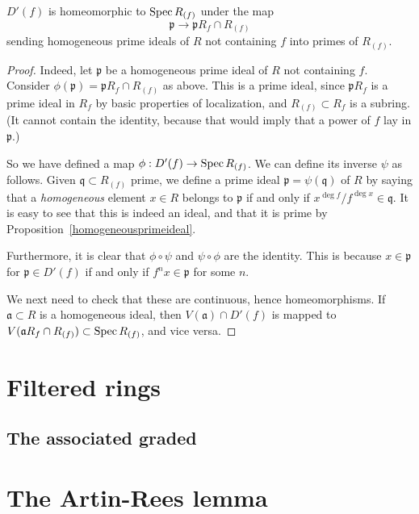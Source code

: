 \begin{proposition} 
$D'(f)$ is homeomorphic to $\operatorname{Spec} R_{(f)}$ under the map
\[  \mathfrak{p}  \to \mathfrak{p} R_f \cap R_{(f)}  \]
sending homogeneous prime ideals of $R$ not containing $f$ into primes of
$R_{(f)}$.
\end{proposition} 
\begin{proof} 
Indeed, let $\mathfrak{p}$ be a homogeneous prime ideal of $R$ not containing
$f$. Consider $\phi(\mathfrak{p}) = \mathfrak{p} R_f \cap R_{(f)} $ as above.
This is a prime ideal, since $\mathfrak{p}  R_f$ is a prime ideal in $R_f$ by
basic properties of localization, and $R_{(f)} \subset R_f$ is a subring. (It
cannot contain the identity, because that would imply that a power of $f$ lay
in $\mathfrak{p}$.)

So we have defined a map $\phi: D'(f) \to \operatorname{Spec} R_{(f)}$.  We can define its
inverse $\psi$ as follows. Given $\mathfrak{q} \subset R_{(f)} $ prime, we define a
prime ideal $\mathfrak{p} = \psi(\mathfrak{q})$ of $R$ by saying that a \textit{homogeneous} element $x \in
R$ belongs to $\mathfrak{p}$ if and only if $x^{\deg f}/f^{\deg x} \in
\mathfrak{q}$. It is easy to see that this is indeed an ideal, and that it is
prime by Proposition~\ref{homogeneousprimeideal}.

Furthermore, it is clear that $\phi \circ \psi $ and $\psi \circ \phi$ are the identity.
This is because $x \in \mathfrak{p}$ for $\mathfrak{p} \in D'(f)$ if and only
if $f^n x \in \mathfrak{p}$ for some $n$.

We next need to check that these are continuous, hence homeomorphisms.  If
$\mathfrak{a} \subset R$ is a homogeneous ideal, then $V(\mathfrak{a}) \cap
D'(f)$ is
mapped to $V(\mathfrak{a}R_f \cap R_{(f)}) \subset \operatorname{Spec} R_{(f)}$, and vice
versa.
\end{proof} 

\section{Filtered rings}

\subsection{The associated graded}

\section{The Artin-Rees lemma}
